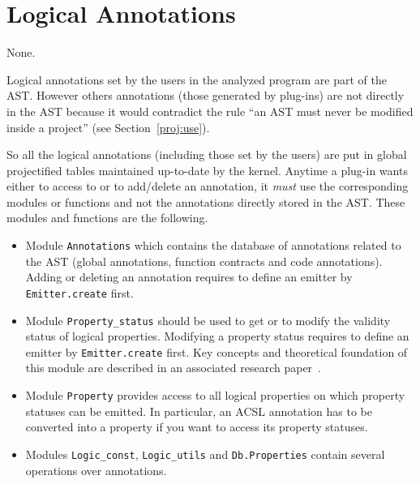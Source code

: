 
\section{Logical Annotations}\label{adv:annotations}

\begin{prereq}
  None.
\end{prereq}

Logical annotations set by the users in the analyzed \C program are part of the
AST. However others annotations (those generated by plug-ins) are
not directly in the AST because it would contradict the rule ``an AST must
never be modified inside a project'' (see Section~\ref{proj:use}).

So all the logical annotations (including those set by the users) are put in
global projectified tables maintained up-to-date by the \framac kernel. Anytime
a plug-in wants either to access to or to add/delete an annotation, it
\emph{must} use the corresponding modules or functions and not the annotations
directly stored in the AST. These modules and functions are the following.
\begin{itemize}
\item Module \texttt{Annotations} which contains the
  database of annotations related to the AST (global annotations, function
  contracts and code annotations). Adding or deleting an annotation requires to
  define an emitter by \texttt{Emitter.create} first.
\item Module \texttt{Property\_status} should
  be used to get or to modify the validity status of logical
  properties. Modifying a property status requires to define an emitter by
  \texttt{Emitter.create} first. Key concepts and
  theoretical foundation of this module are described in an associated research
  paper~\cite{fmics12}.
\item Module \texttt{Property} provides access to all
  logical properties on which property statuses can be emitted. In particular,
  an ACSL annotation has to be converted into a property if you want to access
  its property statuses.
\item Modules \texttt{Logic\_const},
  \texttt{Logic\_utils} and
  \texttt{Db.Properties} contain several
  operations over annotations.
\end{itemize}

